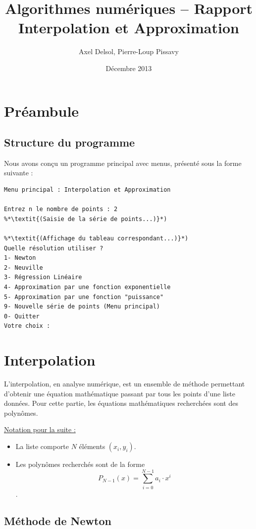 \documentclass{report}
\title{Algorithmes numériques -- Rapport \\ \vspace{0.5cm}Interpolation et Approximation}
\author{Axel Delsol, Pierre-Loup Pissavy}
\date{Décembre 2013}
\begin{document}
  \maketitle
  \tableofcontents

  \chapter{Préambule}
    \section{Structure du programme}
    Nous avons conçu un programme principal avec menus, présenté sous la forme suivante :
    \begin{lstlisting}[style=apercu, name=Menu Principal]
Menu principal : Interpolation et Approximation

Entrez n le nombre de points : 2
%*\textit{(Saisie de la série de points...)}*)

%*\textit{(Affichage du tableau correspondant...)}*)
Quelle résolution utiliser ?
1- Newton
2- Neuville
3- Régression Linéaire
4- Approximation par une fonction exponentielle
5- Approximation par une fonction "puissance"
9- Nouvelle série de points (Menu principal)
0- Quitter
Votre choix :
    \end{lstlisting}
  \chapter{Interpolation}
  	\noindent L'interpolation, en analyse numérique, est un ensemble de méthode permettant d'obtenir une équation mathématique passant par tous les points d'une liste données.
  	\newline
  	Pour cette partie, les équations mathématiques recherchées sont des polynômes.
  	\newline
  	
  	\underline{Notation pour la suite :}
  	\vspace{0.1 cm}
  	\begin{itemize}
  	\item{La liste comporte $N$ éléments $(x_{i},y_{i})$.}
  	\item{Les polynômes recherchés sont de la forme \[P_{N-1}(x)= \sum_{i=0}^{N-1} a_{i} \cdot x^{i}\].}
  	\end{itemize}
    \section{Méthode de Newton}
\end{document}
